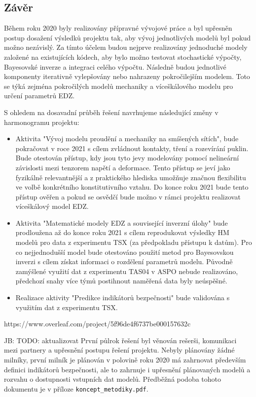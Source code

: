 \documentclass[11pt,a4paper]{article}
\newcommand{\jb}[1]{{\color{violet} JB: #1}}
\begin{document}
\begin{onehalfspacing}
\section{Závěr}
Během roku 2020 byly realizovány přípravné vývojové práce a byl upřesněn postup dosažení výsledků projektu tak, aby 
vývoj jednotlivých modelů byl pokud možno nezávislý. Za tímto účelem budou nejprve realizovány jednoduché modely založené na existujících kódech, aby bylo možno testovat stochastické výpočty, Bayesovské inverze a integraci celého výpočtu.
Následně budou jednotlivé komponenty iterativně vylepšovány nebo nahrazeny pokročilejším modelem.  Toto se týká zejména 
pokročilých modelů mechaniky a víceškálového modelu pro určení parametrů EDZ.

S ohledem na dosavadní průběh řešení navrhujeme následující změny v harmonogramu projektu:
\begin{itemize}
    \item Aktivita "Vývoj modelu proudění a mechaniky na smíšených sítích", bude pokračovat v roce 2021 s cílem 
zvládnout kontakty, tření a rozevírání puklin. Bude otestován přístup, kdy jsou tyto jevy modelovány pomocí 
nelineární závislosti mezi tenzorem napětí a deformace. Tento přístup se jeví jako fyzikálně relevantnější a z praktického 
hlediska umožňuje značnou flexibilitu ve volbě konkrétního konstitutivního vztahu. Do konce roku 2021 bude tento přístup ověřen
a pokud se osvědčí bude možno v rámci projektu realizovat víceškálový model EDZ.
    \item Aktivita "Matematické modely EDZ a související inverzní úlohy" bude prodloužena až do konce roku 2021 s 
    cílem reprodukovat výsledky HM modelů pro data z experimentu TSX (za předpokladu přístupu k datům). Pro co nejjednodušší 
    model bude otestováno použití metod pro Bayesovskou inverzi s cílem získat informaci o rozdělení parametrů modelu. Původně zamýšlené využití dat z experimentu TAS04 v ASPO nebude realizováno, předchozí snahy více týmů postihnout naměřená data byly neúspěšné.  
    \item Realizace aktivity "Predikce indikátorů bezpečnosti" bude validována s využitím dat z experimentu TSX.
\end{itemize}

https://www.overleaf.com/project/5f96de4f6737be000157632c



\jb{TODO: aktualizovat}
První půlrok řešení byl věnován rešerši, komunikaci mezi partnery a upřesnění postupu řešení projektu.
Nebyly plánovány žádné milníky, první milník je plánován v polovině roku 2020 má zahrnovat především definici indikátorů bezpečnosti, ale to zahrnuje i upřesnění plánovaných modelů a rozvahu o dostupnosti vstupních dat modelů. Předběžná podoba tohoto dokumentu je v příloze \verb'koncept_metodiky.pdf'.


\end{onehalfspacing}
\end{document}
